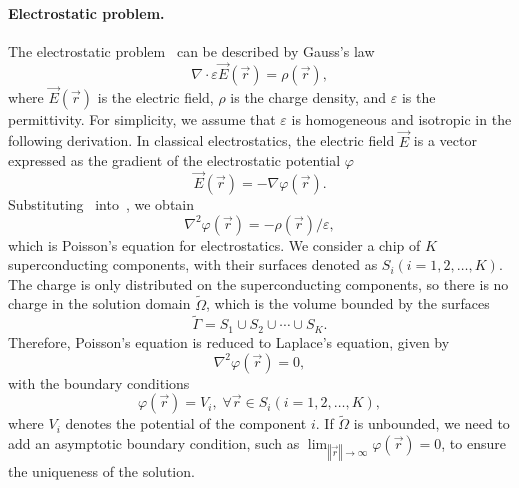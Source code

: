 \documentclass[a4paper,onecolumn,11pt,unpublished]{quantumarticle}
\begin{document}
\paragraph{Electrostatic problem.}The electrostatic problem~\cite{BookClassicalelectrodynamics1999, BookIntroductiontoelectrodynamics2024} can be described by Gauss's law 
\begin{equation}
     \nabla \cdot \varepsilon \vec{E}\left(\vec{r}\right) = \rho\left(\vec{r}\right),
    \label{eq:Gauss_law}
\end{equation}
where $\vec{E}\left(\vec{r}\right)$ is the electric field, $\rho$ is the charge density, and $\varepsilon$ is the permittivity. For simplicity, we assume that $\varepsilon$ is homogeneous and isotropic in the following derivation. In classical electrostatics, the electric field $\vec{E}$ is a vector expressed as the gradient of the electrostatic potential $\varphi$
\begin{equation}
    \vec{E}\left(\vec{r}\right)= - \nabla \varphi\left(\vec{r}\right).
    \label{eq:grad_E}
\end{equation}
Substituting~ into~, we obtain
\begin{equation}
    \nabla^2 \varphi\left(\vec{r}\right) = - \rho \left(\vec{r}\right) / \varepsilon,
    \label{eq:Poisson}
\end{equation}
which is Poisson's equation for electrostatics. We consider a chip of $K$ superconducting components, with their surfaces denoted as $S_i \left( i = 1, 2, \ldots, K \right)$. 
The charge is only distributed on the superconducting components, so there is no charge in the solution domain $\tilde{\Omega}$, which is the volume bounded by the surfaces
\begin{equation}
    \tilde{\Gamma} = S_{1}\cup S_{2}\cup\cdots\cup S_{K}. 
\end{equation}
Therefore, Poisson's equation is reduced to Laplace's equation, given by
\begin{equation}
    \nabla^2 \varphi \left(\vec{r}\right) = 0,
    \label{eq:Laplace}
\end{equation}
with the boundary conditions
\begin{equation}
    \varphi \left(\vec{r}\right) = V_i, \; \forall \vec{r} \in S_i  \left( i = 1, 2, \ldots, K \right),
\end{equation}
where $V_i$ denotes the potential of the component $i$. If $\tilde{\Omega}$ is unbounded, we need to add an asymptotic boundary condition, such as $\lim_{\left\Vert \vec{r}\right\Vert \rightarrow\infty}\varphi\left(\vec{r}\right)=0$, to ensure the uniqueness of the solution.
\end{document}
